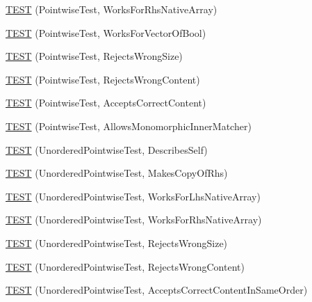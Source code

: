 \begin{DoxyCompactItemize}
\item 
\mbox{\hyperlink{namespacetesting_1_1gmock__matchers__test_adabf6a3ceda0024d630d2ece31e37f7c}{T\+E\+ST}} (Pointwise\+Test, Works\+For\+Rhs\+Native\+Array)
\item 
\mbox{\hyperlink{namespacetesting_1_1gmock__matchers__test_a9c640ab477c872e25de719b6ed980d7c}{T\+E\+ST}} (Pointwise\+Test, Works\+For\+Vector\+Of\+Bool)
\item 
\mbox{\hyperlink{namespacetesting_1_1gmock__matchers__test_a1f73a8fa9dd9560bd606a990444a81fe}{T\+E\+ST}} (Pointwise\+Test, Rejects\+Wrong\+Size)
\item 
\mbox{\hyperlink{namespacetesting_1_1gmock__matchers__test_a135ad7162da91c9a234193fbbe5ef775}{T\+E\+ST}} (Pointwise\+Test, Rejects\+Wrong\+Content)
\item 
\mbox{\hyperlink{namespacetesting_1_1gmock__matchers__test_a42b98b370f1897cecfafbbfba53f4f38}{T\+E\+ST}} (Pointwise\+Test, Accepts\+Correct\+Content)
\item 
\mbox{\hyperlink{namespacetesting_1_1gmock__matchers__test_a9bbef6d651166c37af32c54923bcd849}{T\+E\+ST}} (Pointwise\+Test, Allows\+Monomorphic\+Inner\+Matcher)
\item 
\mbox{\hyperlink{namespacetesting_1_1gmock__matchers__test_af3307f88a321331155a146d49974e3e3}{T\+E\+ST}} (Unordered\+Pointwise\+Test, Describes\+Self)
\item 
\mbox{\hyperlink{namespacetesting_1_1gmock__matchers__test_a05e9bbee9d19692f45a846c2ff45e016}{T\+E\+ST}} (Unordered\+Pointwise\+Test, Makes\+Copy\+Of\+Rhs)
\item 
\mbox{\hyperlink{namespacetesting_1_1gmock__matchers__test_a57e330a5ae600f65d4daa2ed57bbc887}{T\+E\+ST}} (Unordered\+Pointwise\+Test, Works\+For\+Lhs\+Native\+Array)
\item 
\mbox{\hyperlink{namespacetesting_1_1gmock__matchers__test_ae75a933b86db4c43a7bec2ffa97692ef}{T\+E\+ST}} (Unordered\+Pointwise\+Test, Works\+For\+Rhs\+Native\+Array)
\item 
\mbox{\hyperlink{namespacetesting_1_1gmock__matchers__test_a50412d02c70f8303a087e6832d26ba62}{T\+E\+ST}} (Unordered\+Pointwise\+Test, Rejects\+Wrong\+Size)
\item 
\mbox{\hyperlink{namespacetesting_1_1gmock__matchers__test_a9a9a85c6598ab74463703acbd01aa1a7}{T\+E\+ST}} (Unordered\+Pointwise\+Test, Rejects\+Wrong\+Content)
\item 
\mbox{\hyperlink{namespacetesting_1_1gmock__matchers__test_aa68bf48e4a8fa41fcd60f59cc60ede8f}{T\+E\+ST}} (Unordered\+Pointwise\+Test, Accepts\+Correct\+Content\+In\+Same\+Order)

\end{DoxyCompactItemize}

